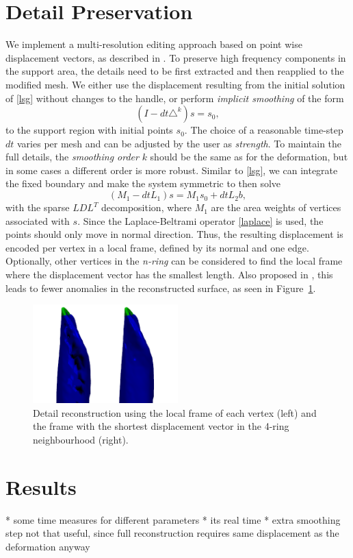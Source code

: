 \documentclass[twocolumn]{article}
\begin{document}
\section{Detail Preservation}
We implement a multi-resolution editing approach based on point wise displacement vectors, as described in \cite{kobbelt1998interactive}.
To preserve high frequency components in the support area, the details need to be first extracted and then reapplied to the modified mesh. We either use the displacement resulting from the initial solution of \eqref{lsg} without changes to the handle, or perform \textit{implicit smoothing} of the form
\begin{equation}
(I - dt \triangle^k) s = s_0,
\end{equation}
to the support region with initial points $s_0$. The choice of a reasonable time-step $dt$ varies per mesh and can be adjusted by the user as \textit{strength}.
To maintain the full details, the \textit{smoothing order} $k$ should be the same as for the deformation, but in some cases a different order is more robust.
Similar to \eqref{lsg}, we can integrate the fixed boundary and make the system symmetric to then solve
\begin{equation}
(M_1 - dt L_1) s = M_1 s_0 + dt L_2 b,
\end{equation}
with the sparse $LDL^T$ decomposition, where $M_1$ are the area weights of vertices associated with $s$.
Since the Laplace-Beltrami operator \eqref{laplace} is used, the points should only move in normal direction.
Thus, the resulting displacement is encoded per vertex in a local frame, defined by its normal and one edge. Optionally, other vertices in the \textit{n-ring} can be considered to find the local frame where the displacement vector has the smallest length. Also proposed in \cite{kobbelt1998interactive}, this leads to fewer anomalies in the reconstructed surface, as seen in Figure~\ref{fig:searchRing}.
\begin{figure}
	\includegraphics[width=0.5\textwidth]{searchframe.png}
	\caption{Detail reconstruction using the local frame of each vertex (left) and the frame with the shortest displacement vector in the 4-ring neighbourhood (right). }
	\label{fig:searchRing}
\end{figure}

\section{Results}
* some time measures for different parameters
* its real time
* extra smoothing step not that useful, since full reconstruction requires same displacement as the deformation anyway



\end{document}
